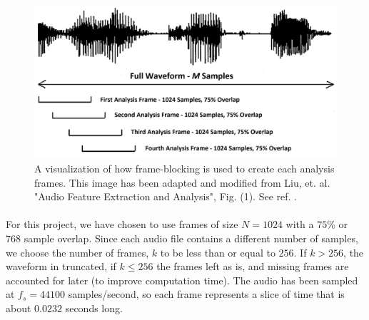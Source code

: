 \documentclass[12pt,letterpaper]{article}
\begin{document}
\begin{figure}[H]
\begin{center}
\includegraphics[scale=0.45]{../Figures/AnalysisFrames}
\end{center}
\caption{A visualization of how frame-blocking is used to create each analysis frames. This image has been adapted and modified from Liu, et. al. "Audio Feature Extraction and Analysis", Fig. (1). See ref. \cite{Liu}.}
\label{fig-AnalysisFrames}
\end{figure}

\paragraph*{}For this project, we have chosen to use frames of size $N = 1024$ with a $75\%$ or $768$ sample overlap. Since each audio file contains a different number of samples, we choose the number of frames, $k$ to be less than or equal to $256$. If $k > 256$, the waveform in truncated, if $k \leq 256$ the frames left as is, and missing frames are accounted for later (to improve computation time). The audio has been sampled at $f_s = 44100$ samples/second, so each frame represents a slice of time that is about $0.0232$ seconds long.
\end{document}
